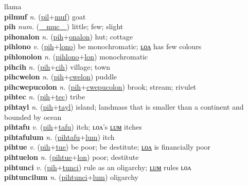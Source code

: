 llama \label{pilut} \\
\textbf{pilmuf} \textit{n.} (\hyperref[pil]{pil}+\hyperref[muf]{muf})
goat \label{pilmuf} \\
\textbf{pih} \textit{num.} (\hyperref[muc]{~~muc~~})
little; few; slight \label{pih} \\
\textbf{pihonalon} \textit{n.} (\hyperref[pih]{pih}+\hyperref[onalon]{onalon})
hut; cottage \label{pihonalon} \\
\textbf{pihlono} \textit{v.} (\hyperref[pih]{pih}+\hyperref[lono]{lono})
be monochromatic; \hyperref[pihlonolon]{ʟᴏᴧ} has few colours \label{pihlono} \\
\textbf{pihlonolon} \textit{n.} (\hyperref[pihlono]{pihlono}+\hyperref[lon]{lon})
monochromatic \label{pihlonolon} \\
\textbf{pihcih} \textit{n.} (\hyperref[pih]{pih}+\hyperref[cih]{cih})
village; town \label{pihcih} \\
\textbf{pihcwelon} \textit{n.} (\hyperref[pih]{pih}+\hyperref[cwelon]{cwelon})
puddle \label{pihcwelon} \\
\textbf{pihcwepucolon} \textit{n.} (\hyperref[pih]{pih}+\hyperref[cwepucolon]{cwepucolon})
brook; stream; rivulet \label{pihcwepucolon} \\
\textbf{pihtec} \textit{n.} (\hyperref[pih]{pih}+\hyperref[tec]{tec})
tribe \label{pihtec} \\
\textbf{pihtayl} \textit{n.} (\hyperref[pih]{pih}+\hyperref[tayl]{tayl})
island; landmass that is smaller than a continent and bounded by ocean \label{pihtayl} \\
\textbf{pihtafu} \textit{v.} (\hyperref[pih]{pih}+\hyperref[tafu]{tafu})
itch; ʟᴏᴧ’s \hyperref[pihtafulum]{ʟᴜᴍ} itches \label{pihtafu} \\
\textbf{pihtafulum} \textit{n.} (\hyperref[pihtafu]{pihtafu}+\hyperref[lum]{lum})
itch \label{pihtafulum} \\
\textbf{pihtue} \textit{v.} (\hyperref[pih]{pih}+\hyperref[tue]{tue})
be poor; be destitute; \hyperref[pihtuelon]{ʟᴏᴧ} is financially poor \label{pihtue} \\
\textbf{pihtuelon} \textit{n.} (\hyperref[pihtue]{pihtue}+\hyperref[lon]{lon})
poor; destitute \label{pihtuelon} \\
\textbf{pihtunci} \textit{v.} (\hyperref[pih]{pih}+\hyperref[tunci]{tunci})
rule as an oligarchy; \hyperref[pihtuncilum]{ʟᴜᴍ} rules ʟᴏᴧ \label{pihtunci} \\
\textbf{pihtuncilum} \textit{n.} (\hyperref[pihtunci]{pihtunci}+\hyperref[lum]{lum})
oligarchy \label{pihtuncilum} \\

